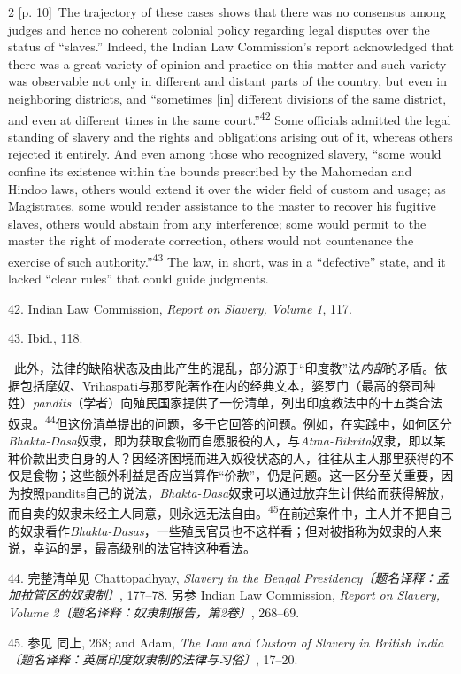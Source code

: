 \documentclass[10pt,a4paper]{article}
\begin{document}
\begin{paracol}{2}
\switchcolumn
{\scriptsize\color{gray} [p. 10]}\ The trajectory of these cases shows that there was no consensus among judges and hence no coherent colonial policy regarding legal disputes over the status of “slaves.” Indeed, the Indian Law Commission’s report acknowledged that there was a great variety of opinion and practice on this matter and such variety was observable not only in different and distant parts of the country, but even in neighboring districts, and “sometimes [in] different divisions of the same district, and even at different times in the same court.”\nobreak\textsuperscript{42} Some officials admitted the legal standing of slavery and the rights and obligations arising out of it, whereas others rejected it entirely. And even among those who recognized slavery, “some would confine its existence within the bounds prescribed by the Mahomedan and Hindoo laws, others would extend it over the wider field of custom and usage; as Magistrates, some would render assistance to the master to recover his fugitive slaves, others would abstain from any interference; some would permit to the master the right of moderate correction, others would not countenance the exercise of such authority.”\nobreak\textsuperscript{43} The law, in short, was in a “defective” state, and it lacked “clear rules” that could guide judgments.\par{\small 42. Indian Law Commission, \textit{Report on Slavery, Volume 1}, 117.\par}{\small 43. Ibid., 118.\par}
\switchcolumn*
{\scriptsize\color{gray} [p. 11]}\ 此外，法律的缺陷状态及由此产生的混乱，部分源于“印度教”法\textit{内部}的矛盾。依据包括摩奴、Vrihaspati与那罗陀著作在内的经典文本，婆罗门（最高的祭司种姓）\textit{pandits}（学者）向殖民国家提供了一份清单，列出印度教法中的十五类合法奴\mbox{隶。\textsuperscript{44}}但这份清单提出的问题，多于它回答的问题。例如，在实践中，如何区分\textit{Bhakta-Dasa}奴隶，即为获取食物而自愿服役的人，与\textit{Atma-Bikrita}奴隶，即以某种价款出卖自身的人？因经济困境而进入奴役状态的人，往往从主人那里获得的不仅是食物；这些额外利益是否应当算作“价款”，仍是问题。这一区分至关重要，因为按照pandits自己的说法，\textit{Bhakta-Dasa}奴隶可以通过放弃生计供给而获得解放，而自卖的奴隶未经主人同意，则永远无法自\mbox{由。\textsuperscript{45}}在前述案件中，主人并不把自己的奴隶看作\textit{Bhakta-Dasas}，一些殖民官员也不这样看；但对被指称为奴隶的人来说，幸运的是，最高级别的法官持这种看法。\par{\small 44. 完整清单见 Chattopadhyay, \textit{Slavery in the Bengal Presidency〔题名译释：孟加拉管区的奴隶制〕}, 177–78. 另参 Indian Law Commission, \textit{Report on Slavery, Volume 2〔题名译释：奴隶制报告，第2卷〕}, 268–69.\par}{\small 45. 参见 同上, 268; and Adam, \textit{The Law and Custom of Slavery in British India〔题名译释：英属印度奴隶制的法律与习俗〕}, 17–20.\par}

\end{paracol}
\end{document}
